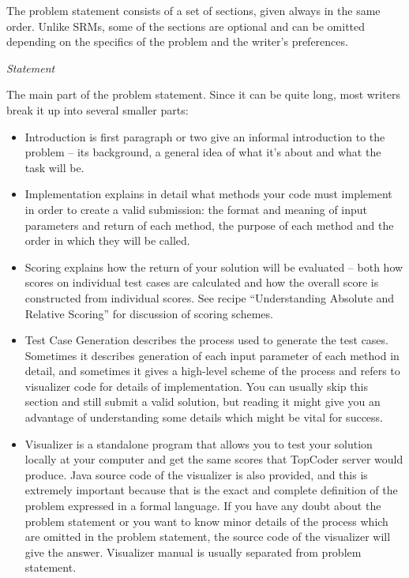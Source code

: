 \documentclass[]{article}
\begin{document}
The problem statement consists of a set of sections, given always in the
same order. Unlike SRMs, some of the sections are optional and can be
omitted depending on the specifics of the problem and the writer's
preferences.

\emph{Statement}

The main part of the problem statement. Since it can be quite long, most
writers break it up into several smaller parts:

\begin{itemize}
\item
  Introduction is first paragraph or two give an informal introduction
  to the problem -- its background, a general idea of what it's about
  and what the task will be.
\item
  Implementation explains in detail what methods your code must
  implement in order to create a valid submission: the format and
  meaning of input parameters and return of each method, the purpose of
  each method and the order in which they will be called.
\item
  Scoring explains how the return of your solution will be evaluated --
  both how scores on individual test cases are calculated and how the
  overall score is constructed from individual scores. See recipe
  ``Understanding Absolute and Relative Scoring'' for discussion of
  scoring schemes.
\item
  Test Case Generation describes the process used to generate the test
  cases. Sometimes it describes generation of each input parameter of
  each method in detail, and sometimes it gives a high-level scheme of
  the process and refers to visualizer code for details of
  implementation. You can usually skip this section and still submit a
  valid solution, but reading it might give you an advantage of
  understanding some details which might be vital for success.
\item
  Visualizer is a standalone program that allows you to test your
  solution locally at your computer and get the same scores that
  TopCoder server would produce. Java source code of the visualizer is
  also provided, and this is extremely important because that is the
  exact and complete definition of the problem expressed in a formal
  language. If you have any doubt about the problem statement or you
  want to know minor details of the process which are omitted in the
  problem statement, the source code of the visualizer will give the
  answer. Visualizer manual is usually separated from problem statement.
\end{itemize}
\end{document}
